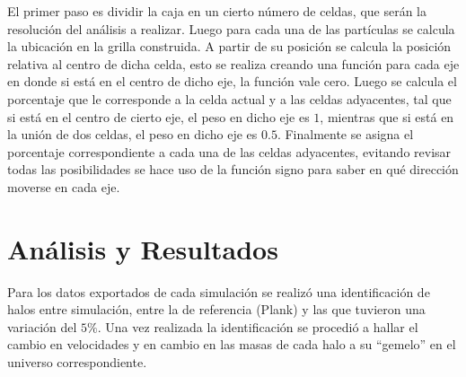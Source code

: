 El primer paso es dividir la caja en un cierto número de celdas, que serán la resolución del análisis a realizar. Luego para cada una de las partículas se calcula la ubicación en la grilla construida. A partir de su posición se calcula la posición relativa al centro de dicha celda, esto se realiza creando una función para cada eje en donde si está en el centro de dicho eje, la función vale cero. Luego se calcula el porcentaje que le corresponde a la celda actual y a las celdas adyacentes, tal que si está en el centro de cierto eje, el peso en dicho eje es $1$, mientras que si está en la unión de dos celdas, el peso en dicho eje es $0.5$. Finalmente se asigna el porcentaje correspondiente a cada una de las celdas adyacentes, evitando revisar todas las posibilidades se hace uso de la función signo para saber en qué dirección moverse en cada eje. 


\section{Análisis y Resultados}
Para los datos exportados de cada simulación se realizó una identificación de halos entre simulación, entre la de referencia (Plank) y las que tuvieron una variación del $5\%$. Una vez realizada la identificación se procedió a hallar el cambio en velocidades y en cambio en las masas de cada halo a su ``gemelo'' en el universo correspondiente.


